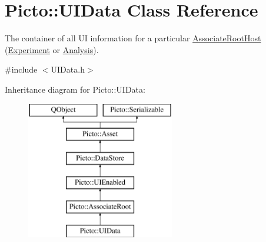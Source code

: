 \hypertarget{class_picto_1_1_u_i_data}{\section{Picto\-:\-:U\-I\-Data Class Reference}
\label{class_picto_1_1_u_i_data}
}


The container of all U\-I information for a particular \hyperlink{class_picto_1_1_associate_root_host}{Associate\-Root\-Host} (\hyperlink{class_picto_1_1_experiment}{Experiment} or \hyperlink{class_picto_1_1_analysis}{Analysis}).  




{\ttfamily \#include $<$U\-I\-Data.\-h$>$}

Inheritance diagram for Picto\-:\-:U\-I\-Data\-:\begin{figure}[H]
\begin{center}
\leavevmode
\includegraphics[height=6.000000cm]{class_picto_1_1_u_i_data}
\end{center}
\end{figure}
